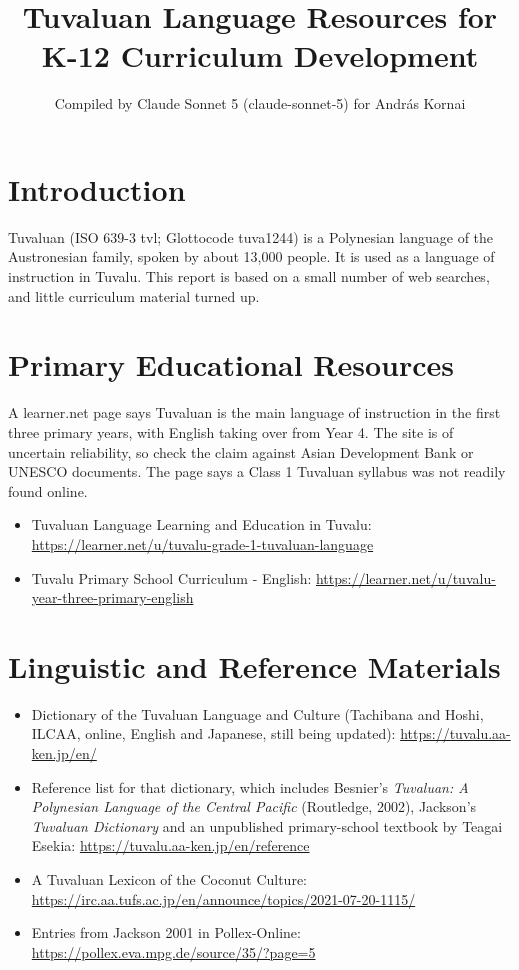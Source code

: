 \documentclass[12pt]{article}
\title{Tuvaluan Language Resources for K-12 Curriculum Development}
\author{Compiled by Claude Sonnet 5 (claude-sonnet-5) for Andr\'as Kornai}
\date{}
\begin{document}
\maketitle

\section{Introduction}
Tuvaluan (ISO 639-3 tvl; Glottocode tuva1244) is a Polynesian language of the Austronesian family, spoken by about 13,000 people. It is used as a language of instruction in Tuvalu. This report is based on a small number of web searches, and little curriculum material turned up.

\section{Primary Educational Resources}
A learner.net page says Tuvaluan is the main language of instruction in the first three primary years, with English taking over from Year 4. The site is of uncertain reliability, so check the claim against Asian Development Bank or UNESCO documents. The page says a Class 1 Tuvaluan syllabus was not readily found online.
\begin{itemize}
\item Tuvaluan Language Learning and Education in Tuvalu: \url{https://learner.net/u/tuvalu-grade-1-tuvaluan-language}
\item Tuvalu Primary School Curriculum - English: \url{https://learner.net/u/tuvalu-year-three-primary-english}
\end{itemize}

\section{Linguistic and Reference Materials}
\begin{itemize}
\item Dictionary of the Tuvaluan Language and Culture (Tachibana and Hoshi, ILCAA, online, English and Japanese, still being updated): \url{https://tuvalu.aa-ken.jp/en/}
\item Reference list for that dictionary, which includes Besnier's \emph{Tuvaluan: A Polynesian Language of the Central Pacific} (Routledge, 2002), Jackson's \emph{Tuvaluan Dictionary} and an unpublished primary-school textbook by Teagai Esekia: \url{https://tuvalu.aa-ken.jp/en/reference}
\item A Tuvaluan Lexicon of the Coconut Culture: \url{https://irc.aa.tufs.ac.jp/en/announce/topics/2021-07-20-1115/}
\item Entries from Jackson 2001 in Pollex-Online: \url{https://pollex.eva.mpg.de/source/35/?page=5}
\end{itemize}
\end{document}

